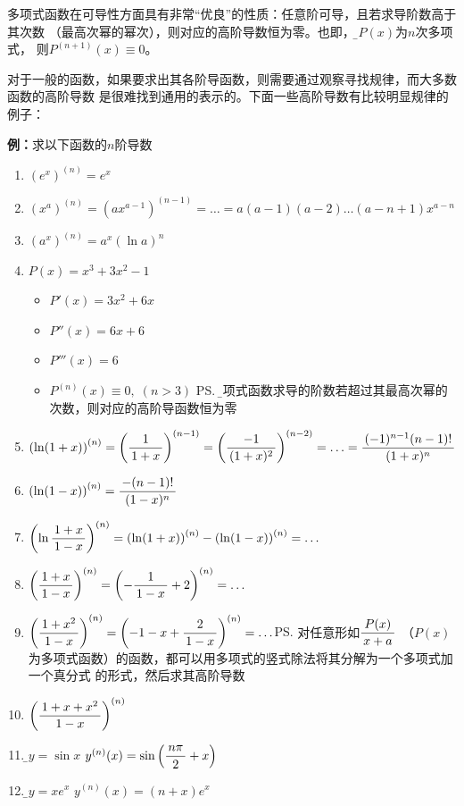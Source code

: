 多项式函数在可导性方面具有非常“优良”的性质：任意阶可导，且若求导阶数高于其次数
（最高次幂的幂次），则对应的高阶导数恒为零。也即，{\b 若$P(x)$为$n$次多项式，
则$P^{(n+1)}(x)\equiv0$}。

对于一般的函数，如果要求出其各阶导函数，则需要通过观察寻找规律，而大多数函数的高阶导数
是很难找到通用的表示的。下面一些高阶导数有比较明显规律的例子：

{\bf 例：}求以下函数的$n$阶导数
\begin{enumerate}[(1)]
  \setlength{\itemindent}{1cm}
  \item $\left(e^x\right)^{(n)}=e^x$
  \item $\left(x^a\right)^{(n)}=\left(ax^{a-1}\right)^{(n-1)}
  =\ldots=a(a-1)(a-2)\ldots(a-n+1)x^{a-n}$
  \item $\left(a^x\right)^{(n)}=a^x\left(\ln a\right)^n$
  \item $P(x)=x^3+3x^2-1$
  \begin{itemize}
    \item $P'(x)=3x^2+6x$
    \item $P''(x)=6x+6$
    \item $P'''(x)=6$
    \item $P^{(n)}(x)\equiv0,\;(n>3)$
    \ps{\b 多项式函数求导的阶数若超过其最高次幂的次数，则对应的高阶导函数恒为零}
  \end{itemize}
  \item $\left(\ln(1+x)\right)^{(n)}=\left(\displaystyle\frac{\,{1}\,}{\,{1+x}\,}\right)^{(n-1)}
  =\left(\displaystyle\frac{\,{-1}\,}{\,{(1+x)^2}\,}\right)^{(n-2)}=\ldots
  =\displaystyle\frac{\,{(-1)^{n-1}(n-1)!}\,}{\,{(1+x)^{n}}\,}$
  \item $\left(\ln(1-x)\right)^{(n)}=\displaystyle\frac{\,{-(n-1)!}\,}{\,{(1-x)^{n}}\,}$
  \item $\left(\ln\displaystyle\frac{\,{1+x}\,}{\,{1-x}\,}\right)^{(n)}
  =\left(\ln(1+x)\right)^{(n)}-\left(\ln(1-x)\right)^{(n)}=\ldots$
  \item $\left(\displaystyle\frac{\,{1+x}\,}{\,{1-x}\,}\right)^{(n)}
  =\left(-\displaystyle\frac{\,{1}\,}{\,{1-x}\,}+2\right)^{(n)}=\ldots$
  \item $\left(\displaystyle\frac{\,{1+x^2}\,}{\,{1-x}\,}\right)^{(n)}
  =\left(-1-x+\displaystyle\frac{\,{2}\,}{\,{1-x}\,}\right)^{(n)}=\ldots$\ps{对任意形如$\displaystyle\frac{\,{P(x)}\,}{\,{x+a}\,}$
  （$P(x)$为多项式函数）的函数，都可以用多项式的竖式除法将其分解为一个多项式加一个真分式
  的形式，然后求其高阶导数}
  \item $\left(\displaystyle\frac{\,{1+x+x^2}\,}{\,{1-x}\,}\right)^{(n)}$
  \item {\b$y=\sin x$ \hfill
  $y^{(n)}(x)=\sin\left(\displaystyle\frac{\,{n\pi}\,}{\,{2}\,}+x\right)$} 
  \item {\b$y=xe^x$ \hfill $y^{(n)}(x)=(n+x)e^x$}
\end{enumerate}

